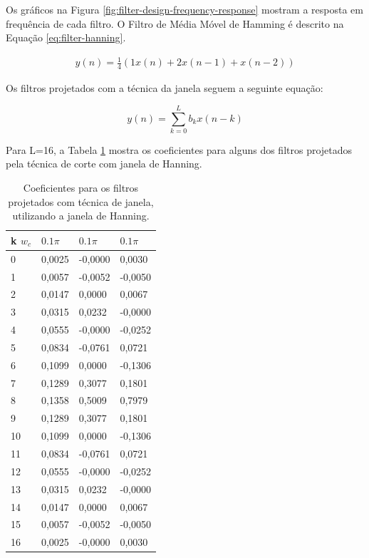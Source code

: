 Os gráficos na Figura \ref{fig:filter-design-frequency-response} mostram a
resposta em frequência de cada filtro. O Filtro de Média Móvel de Hamming é
descrito na Equação \ref{eq:filter-hanning}.

\begin{align}
\label{eq:filter-hanning}
y(n) = \frac{1}{4}(1 x(n) + 2 x(n-1) + x(n-2))
\end{align}

Os filtros projetados com a técnica da janela seguem a seguinte equação:

\begin{equation}
	y(n) = \sum_{k=0}^L b_k x(n-k)
\end{equation}

Para L=16, a Tabela \ref{tab:fir-filters-coefs} mostra os coeficientes para
alguns dos filtros projetados pela técnica de corte com janela de Hanning.

\begin{table}
\centering
\begin{tabular}{|l|l|l|l|}\hline
k \/$w_c$ & $0.1\pi$ & $0.1\pi$ & $0.1\pi$ \\ \hline
  0	& 0,0025	&   -0,0000	&		0,0030 \\		
 1	& 0,0057	&   -0,0052	&	   -0,0050 \\	
 2	& 0,0147	&    0,0000	&	    0,0067 \\	
 3	& 0,0315	&    0,0232	&	   -0,0000 \\	
 4	& 0,0555	&   -0,0000	&	   -0,0252 \\	
 5	& 0,0834	&   -0,0761	&	    0,0721 \\	
 6	& 0,1099	&    0,0000	&	   -0,1306 \\	
 7	& 0,1289	&    0,3077	&	    0,1801 \\	
 8	& 0,1358	&    0,5009	&	    0,7979 \\	
 9	& 0,1289	&    0,3077	&	    0,1801 \\	
10	& 0,1099	&    0,0000	&	   -0,1306 \\	
11	& 0,0834	&   -0,0761	&	    0,0721 \\	
12	& 0,0555	&   -0,0000	&	   -0,0252 \\	
13	& 0,0315	&    0,0232	&	   -0,0000 \\	
14	& 0,0147	&    0,0000	&	    0,0067 \\	
15	& 0,0057	&   -0,0052	&	   -0,0050 \\	
16	& 0,0025	&   -0,0000	&	    0,0030 \\
\hline
\end{tabular}

\caption{Coeficientes para os filtros projetados com técnica de janela,
utilizando a janela de Hanning.}

\label{tab:fir-filters-coefs}
\end{table}


